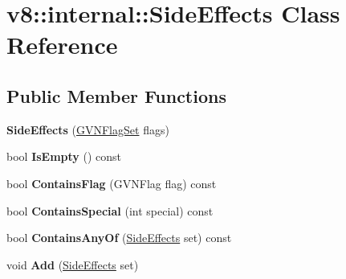 \hypertarget{classv8_1_1internal_1_1_side_effects}{}\section{v8\+:\+:internal\+:\+:Side\+Effects Class Reference}
\label{classv8_1_1internal_1_1_side_effects}
\subsection*{Public Member Functions}
\begin{DoxyCompactItemize}
\item 
{\bfseries Side\+Effects} (\hyperlink{classv8_1_1internal_1_1_enum_set}{G\+V\+N\+Flag\+Set} flags)\hypertarget{classv8_1_1internal_1_1_side_effects_a87c7eeaf354e68950aaee5ad0fe87304}{}\label{classv8_1_1internal_1_1_side_effects_a87c7eeaf354e68950aaee5ad0fe87304}

\item 
bool {\bfseries Is\+Empty} () const \hypertarget{classv8_1_1internal_1_1_side_effects_a0a6684062876b316ef7f019648386dbe}{}\label{classv8_1_1internal_1_1_side_effects_a0a6684062876b316ef7f019648386dbe}

\item 
bool {\bfseries Contains\+Flag} (G\+V\+N\+Flag flag) const \hypertarget{classv8_1_1internal_1_1_side_effects_a541d5e8baffe765f670eee60b0afd52d}{}\label{classv8_1_1internal_1_1_side_effects_a541d5e8baffe765f670eee60b0afd52d}

\item 
bool {\bfseries Contains\+Special} (int special) const \hypertarget{classv8_1_1internal_1_1_side_effects_af1164fe530ee02dca77c1e943b4490e3}{}\label{classv8_1_1internal_1_1_side_effects_af1164fe530ee02dca77c1e943b4490e3}

\item 
bool {\bfseries Contains\+Any\+Of} (\hyperlink{classv8_1_1internal_1_1_side_effects}{Side\+Effects} set) const \hypertarget{classv8_1_1internal_1_1_side_effects_a707af7ffb8b91448eaff01dc8dd9eaae}{}\label{classv8_1_1internal_1_1_side_effects_a707af7ffb8b91448eaff01dc8dd9eaae}

\item 
void {\bfseries Add} (\hyperlink{classv8_1_1internal_1_1_side_effects}{Side\+Effects} set)\hypertarget{classv8_1_1internal_1_1_side_effects_a42d6e5ee5c3f2c013b50cf83bc11bc1f}{}\label{classv8_1_1internal_1_1_side_effects_a42d6e5ee5c3f2c013b50cf83bc11bc1f}


\end{DoxyCompactItemize}
